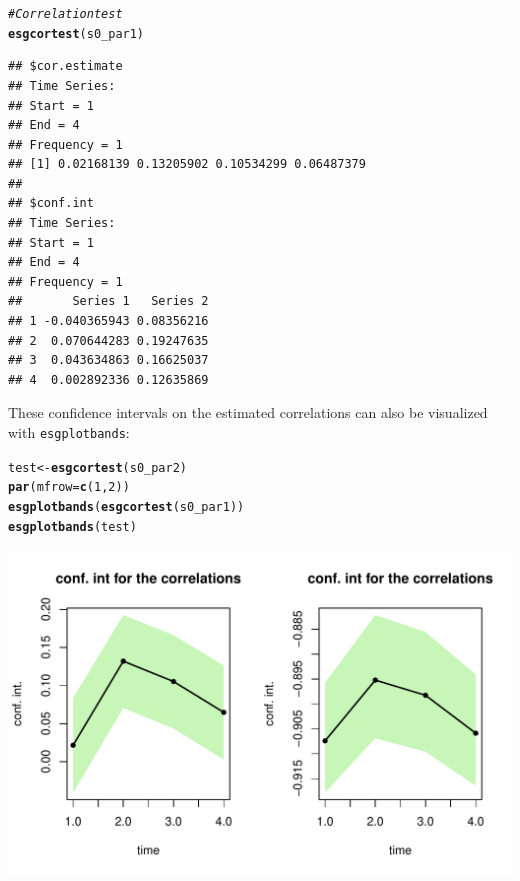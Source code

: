 \documentclass[a4paper]{article}\usepackage[]{graphicx}\usepackage[]{color}
\makeatletter
\def\maxwidth{ %
  \ifdim\Gin@nat@width>\linewidth
    \linewidth
  \else
    \Gin@nat@width
  \fi
}
\newcommand{\hlnum}[1]{\textcolor[rgb]{0.686,0.059,0.569}{#1}}%
\newcommand{\hlcom}[1]{\textcolor[rgb]{0.678,0.584,0.686}{\textit{#1}}}%
\newcommand{\hlstd}[1]{\textcolor[rgb]{0.345,0.345,0.345}{#1}}%
\newcommand{\hlkwb}[1]{\textcolor[rgb]{0.69,0.353,0.396}{#1}}%
\newcommand{\hlkwc}[1]{\textcolor[rgb]{0.333,0.667,0.333}{#1}}%
\newcommand{\hlkwd}[1]{\textcolor[rgb]{0.737,0.353,0.396}{\textbf{#1}}}%
\newenvironment{kframe}{%
 \def\at@end@of@kframe{}%
 \ifinner\ifhmode%
  \def\at@end@of@kframe{\end{minipage}}%
  \begin{minipage}{\columnwidth}%
 \fi\fi%
 \def\FrameCommand##1{\hskip\@totalleftmargin \hskip-\fboxsep
 \colorbox{shadecolor}{##1}\hskip-\fboxsep
     \hskip-\linewidth \hskip-\@totalleftmargin \hskip\columnwidth}%
 \MakeFramed {\advance\hsize-\width
   \@totalleftmargin\z@ \linewidth\hsize
   \@setminipage}}%
 {\par\unskip\endMakeFramed%
 \at@end@of@kframe}
\newenvironment{knitrout}{}{} %
\newcommand{\code}[1]{\mbox{\texttt{#1}}}
\makeatother
\begin{document}
\begin{knitrout}
\color{fgcolor}\begin{kframe}
\begin{alltt}
\hlcom{# Correlation test}
\hlkwd{esgcortest}\hlstd{(s0_par1)}
\end{alltt}
\begin{verbatim}
## $cor.estimate
## Time Series:
## Start = 1 
## End = 4 
## Frequency = 1 
## [1] 0.02168139 0.13205902 0.10534299 0.06487379
## 
## $conf.int
## Time Series:
## Start = 1 
## End = 4 
## Frequency = 1 
##       Series 1   Series 2
## 1 -0.040365943 0.08356216
## 2  0.070644283 0.19247635
## 3  0.043634863 0.16625037
## 4  0.002892336 0.12635869
\end{verbatim}
\end{kframe}
\end{knitrout}

These confidence intervals on the estimated correlations can also be visualized with \code{esgplotbands}:  

\begin{knitrout}
\color{fgcolor}\begin{kframe}
\begin{alltt}
\hlstd{test} \hlkwb{<-} \hlkwd{esgcortest}\hlstd{(s0_par2)}
\hlkwd{par}\hlstd{(}\hlkwc{mfrow}\hlstd{=}\hlkwd{c}\hlstd{(}\hlnum{1}\hlstd{,} \hlnum{2}\hlstd{))}
\hlkwd{esgplotbands}\hlstd{(}\hlkwd{esgcortest}\hlstd{(s0_par1))}
\hlkwd{esgplotbands}\hlstd{(test)}
\end{alltt}
\end{kframe}

{\centering \includegraphics[width=\maxwidth]{figure/example_simshocks_3-1} 

}



\end{knitrout}
\end{document}
